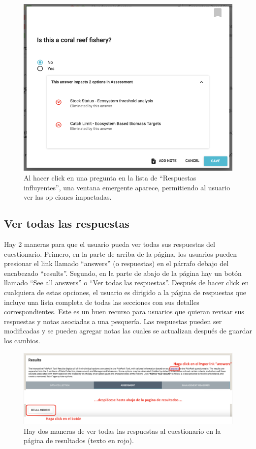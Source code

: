 \documentclass[
  11pt,
]{book}
\begin{document}
\begin{figure}

{\centering \includegraphics[width=0.75\linewidth]{images/influential-answers-expanded} 

}

\caption{Al hacer click en una pregunta en la lista de “Respuestas influyentes”, una ventana emergente aparece, permitiendo al usuario ver las op ciones impactadas.}\label{fig:influential-answers-expanded}
\end{figure}

\hypertarget{ver-todas-las-respuestas}{%
\subsection{Ver todas las respuestas}\label{ver-todas-las-respuestas}}

Hay 2 maneras para que el usuario pueda ver todas sus respuestas del cuestionario. Primero, en la parte de arriba de la página, los usuarios pueden presionar el link llamado ``answers'' (o respuestas) en el párrafo debajo del encabezado ``results''. Segundo, en la parte de abajo de la página hay un botón llamado ``See all answers'' o ``Ver todas las respuestas''. Después de hacer click en cualquiera de estas opciones, el usuario es dirigido a la página de respuestas que incluye una lista completa de todas las secciones con sus detalles correspondientes. Este es un buen recurso para usuarios que quieran revisar sus respuestas y notas asociadas a una pesquería. Las respuestas pueden ser modificadas y se pueden agregar notas las cuales se actualizan después de guardar los cambios.

\begin{figure}
\includegraphics[width=0.75\linewidth]{images/see-all-answers-buttons-es} \caption{Hay dos maneras de ver todas las respuestas al cuestionario en la página de resultados (texto en rojo).}\label{fig:answers-buttons}
\end{figure}
\end{document}
